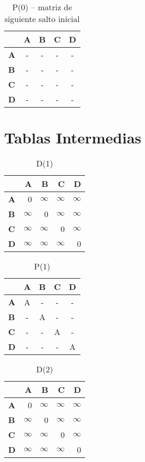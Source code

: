 \documentclass{article}
\newcommand{\INF}{$\infty$}
\begin{document}
\begin{table}[H]\centering
\caption{P(0) -- matriz de siguiente salto inicial}
\begin{tabular}{l c c c c}
\toprule
 & \textbf{A} & \textbf{B} & \textbf{C} & \textbf{D}\\\midrule
\textbf{A} & - & - & - & - \\
\textbf{B} & - & - & - & - \\
\textbf{C} & - & - & - & - \\
\textbf{D} & - & - & - & - \\
\bottomrule
\end{tabular}
\end{table}

\section*{Tablas Intermedias}
\begin{table}[H]\centering
\caption{D(1)}
\begin{tabular}{l r r r r}
\toprule
 & \textbf{A} & \textbf{B} & \textbf{C} & \textbf{D}\\\midrule
\textbf{A} & 0 & \INF & \INF & \INF \\
\textbf{B} & \INF & 0 & \INF & \INF \\
\textbf{C} & \INF & \INF & 0 & \INF \\
\textbf{D} & \INF & \INF & \INF & 0 \\
\bottomrule
\end{tabular}
\end{table}

\begin{table}[H]\centering
\caption{P(1)}
\begin{tabular}{l c c c c}
\toprule
 & \textbf{A} & \textbf{B} & \textbf{C} & \textbf{D}\\\midrule
\textbf{A} & \cellcolor{yellow!30}A & - & - & - \\
\textbf{B} & - & \cellcolor{yellow!30}A & - & - \\
\textbf{C} & - & - & \cellcolor{yellow!30}A & - \\
\textbf{D} & - & - & - & \cellcolor{yellow!30}A \\
\bottomrule
\end{tabular}
\end{table}

\begin{table}[H]\centering
\caption{D(2)}
\begin{tabular}{l r r r r}
\toprule
 & \textbf{A} & \textbf{B} & \textbf{C} & \textbf{D}\\\midrule
\textbf{A} & 0 & \INF & \INF & \INF \\
\textbf{B} & \INF & 0 & \INF & \INF \\
\textbf{C} & \INF & \INF & 0 & \INF \\
\textbf{D} & \INF & \INF & \INF & 0 \\
\bottomrule
\end{tabular}
\end{table}
\end{document}
